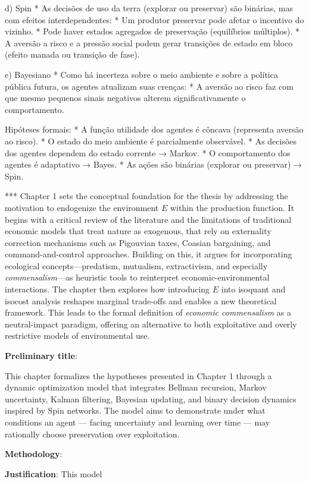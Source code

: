 d) Spin
* As decisões de uso da terra (explorar ou preservar) são binárias, mas com efeitos interdependentes:
* Um produtor preservar pode afetar o incentivo do vizinho.
* Pode haver estados agregados de preservação (equilíbrios múltiplos).
* A aversão a risco e a pressão social podem gerar transições de estado em bloco (efeito manada ou transição de fase).

e) Bayesiano
* Como há incerteza sobre o meio ambiente e sobre a política pública futura, os agentes atualizam suas crenças:
* A aversão ao risco faz com que mesmo pequenos sinais negativos alterem significativamente o comportamento.

Hipóteses formais:
* A função utilidade dos agentes é côncava (representa aversão ao risco).
* O estado do meio ambiente é parcialmente observável.
* As decisões dos agentes dependem do estado corrente → Markov.
* O comportamento dos agentes é adaptativo → Bayes.
* As ações são binárias (explorar ou preservar) → Spin.

***
Chapter 1 sets the conceptual foundation for the thesis by addressing the motivation to endogenize the environment \( E \) within the production function. It begins with a critical review of the literature and the limitations of traditional economic models that treat nature as exogenous, that rely on externality correction mechanisms such as Pigouvian taxes, Coasian bargaining, and command-and-control approaches. Building on this, it argues for incorporating ecological concepts—predatism, mutualism, extractivism, and especially \textit{commensalism}—as heuristic tools to reinterpret economic-environmental interactions. The chapter then explores how introducing \( E \) into isoquant and isocost analysis reshapes marginal trade-offs and enables a new theoretical framework. This leads to the formal definition of \textit{economic commensalism} as a neutral-impact paradigm, offering an alternative to both exploitative and overly restrictive models of environmental use.

\textbf{Preliminary title}: 

This chapter formalizes the hypotheses presented in Chapter 1 through a dynamic optimization model that integrates Bellman recursion, Markov uncertainty, Kalman filtering, Bayesian updating, and binary decision dynamics inspired by Spin networks. The model aims to demonstrate under what conditions an agent — facing uncertainty and learning over time — may rationally choose preservation over exploitation.

\textbf{Methodology}: 

\textbf{Justification}: This model 
